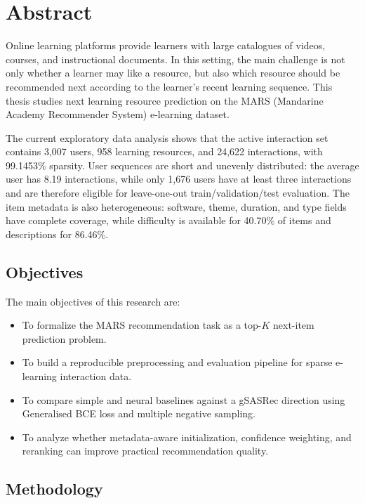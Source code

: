 
\section*{Abstract}

Online learning platforms provide learners with large catalogues of videos, courses, and instructional documents. In this setting, the main challenge is not only whether a learner may like a resource, but also which resource should be recommended next according to the learner's recent learning sequence. This thesis studies next learning resource prediction on the MARS (Mandarine Academy Recommender System) e-learning dataset.

The current exploratory data analysis shows that the active interaction set contains 3,007 users, 958 learning resources, and 24,622 interactions, with 99.1453\% sparsity. User sequences are short and unevenly distributed: the average user has 8.19 interactions, while only 1,676 users have at least three interactions and are therefore eligible for leave-one-out train/validation/test evaluation. The item metadata is also heterogeneous: software, theme, duration, and type fields have complete coverage, while difficulty is available for 40.70\% of items and descriptions for 86.46\%.

\subsection*{Objectives}

The main objectives of this research are:
\begin{itemize}
    \item To formalize the MARS recommendation task as a top-$K$ next-item prediction problem.
    \item To build a reproducible preprocessing and evaluation pipeline for sparse e-learning interaction data.
    \item To compare simple and neural baselines against a gSASRec direction using Generalised BCE loss and multiple negative sampling.
    \item To analyze whether metadata-aware initialization, confidence weighting, and reranking can improve practical recommendation quality.
\end{itemize}

\subsection*{Methodology}

